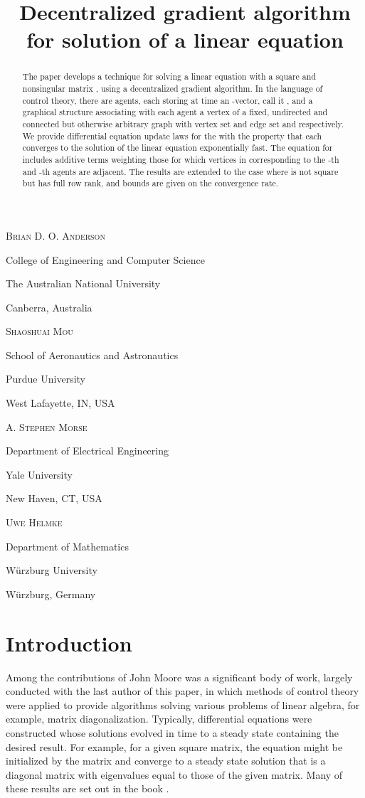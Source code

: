 \documentclass{aims}
\title[Decentralized gradient algorithm for linear equations] {Decentralized gradient algorithm for solution of a linear equation}
\author[Anderson and Mou and Morse and Helmke]{}
\begin{document}
\maketitle

\centerline{\scshape Brian D. O. Anderson}
\medskip
{\footnotesize
\centerline{College of Engineering and Computer Science }
   \centerline{The Australian National University}
   \centerline{ Canberra, Australia}
} 

\medskip

\centerline{\scshape Shaoshuai Mou}
\medskip
{\footnotesize
\centerline{ School of Aeronautics and Astronautics}
   \centerline{Purdue University}
   \centerline{West Lafayette, IN, USA}
}

\medskip

\centerline{\scshape A. Stephen Morse}
\medskip
{\footnotesize
\centerline{Department of Electrical Engineering}
   \centerline{Yale University}
   \centerline{New Haven, CT, USA}
}

\medskip

\centerline{\scshape Uwe Helmke}
\medskip
{\footnotesize
\centerline{Department of Mathematics}
   \centerline{W{\"u}rzburg University}
   \centerline{W{\"u}rzburg, Germany}
}


\bigskip




\begin{abstract}
The paper develops a technique for solving a linear equation  with a square and nonsingular matrix , using a decentralized gradient algorithm. In the language of control theory, there are  agents, each storing at time  an -vector, call it , and a graphical structure associating with each agent a vertex of a fixed, undirected and connected but otherwise arbitrary graph  with vertex set and edge set  and  respectively.  We provide differential equation update laws  for the  with the property that each  converges to the solution of the linear equation exponentially fast. The equation for  includes additive terms weighting those  for which vertices in  corresponding to the -th and -th agents are adjacent. The results are extended to the case where  is not square but has full row rank, and bounds are given on the convergence rate.
\end{abstract}

\section{Introduction}

Among the contributions of John Moore was a significant body of work,
largely conducted with the last author of this paper, in which methods of control theory
were applied to provide algorithms solving various problems of linear
algebra, for example, matrix diagonalization. Typically, differential
equations were constructed whose solutions evolved in time to a steady
state containing the desired result. For example, for a given square
matrix, the equation might be initialized by the matrix and converge
to a steady state solution that is a diagonal matrix with eigenvalues
equal to those of the given matrix.  Many of these results are set
out in the book \cite{UJ94Book}.
\end{document}

